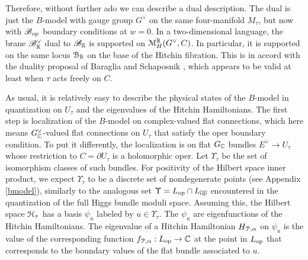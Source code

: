 \documentclass[11pt,a4paper]{article}
\begin{document}
Therefore, without further ado we can describe a dual description.   The dual is just the $B$-model with gauge group $G^\vee$
on the same four-manifold $M_\tau$, but now with
$\B_\op$ boundary conditions at $w=0$.  In a two-dimensional language, the brane $\B^\vee_\R$ dual to $\B_\R$ is supported on $\M_H^\R(G^\vee,C)$.
In particular, it is supported on the same locus ${\cB}_\R$ on the base of the Hitchin fibration.   This is in accord with the duality proposal of
Baraglia and Schaposnik \cite{BaSc}, which appears to be valid at least when $\tau$ acts freely on $C$.



As usual, it is relatively easy to describe the physical states of the $B$-model in quantization on $U_\tau$ and the eigenvalues of the Hitchin Hamiltonians.
The first step is localization of the $B$-model on complex-valued flat connections, which here means $G^\vee_\C$-valued flat connections on $U_\tau$
that satisfy the oper boundary condition.   
To put it differently, the localization is on flat $G_\C$ bundles $E^\vee\to U_\tau$ whose restriction to $C=\partial U_\tau$ is
a holomorphic oper.   Let $\Upsilon_\tau$ be the set of isomorphism classes of such bundles.    
For positivity of the Hilbert space inner product, we expect $\Upsilon_\tau$ to be a discrete set  of nondegenerate points (see
Appendix \ref{bmodel}),
similarly to the analogous set $\Upsilon=L_\op\cap L_\bop$ encountered in the quantization of the full Higgs bundle moduli space.
Assuming this, the Hilbert space $\H_\tau$ has a basis $\psi_u$ labeled by $u\in \Upsilon_\tau$.
The $\psi_u$ are eigenfunctions of the Hitchin Hamiltonians.  The eigenvalue of a Hitchin Hamiltonian $H_{\P,\alpha}$ on $\psi_u$ is the value
of the corresponding function $f_{\P,\alpha}:L_\op\to \C$ at the point in $L_\op$ that corresponds to the boundary values of the flat bundle
associated to $u$.
\end{document}
